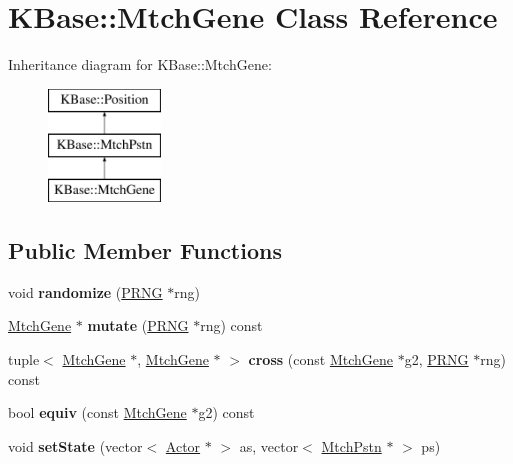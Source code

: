 \hypertarget{class_k_base_1_1_mtch_gene}{\section{K\-Base\-:\-:Mtch\-Gene Class Reference}
\label{class_k_base_1_1_mtch_gene}
}
Inheritance diagram for K\-Base\-:\-:Mtch\-Gene\-:\begin{figure}[H]
\begin{center}
\leavevmode
\includegraphics[height=3.000000cm]{class_k_base_1_1_mtch_gene}
\end{center}
\end{figure}
\subsection*{Public Member Functions}
\begin{DoxyCompactItemize}
\item 
\hypertarget{class_k_base_1_1_mtch_gene_a8386c386632b4e6dd8a99f3f126f0899}{void {\bfseries randomize} (\hyperlink{class_k_base_1_1_p_r_n_g}{P\-R\-N\-G} $\ast$rng)}\label{class_k_base_1_1_mtch_gene_a8386c386632b4e6dd8a99f3f126f0899}

\item 
\hypertarget{class_k_base_1_1_mtch_gene_a489185a8e050f4d697fda5bcbb14d304}{\hyperlink{class_k_base_1_1_mtch_gene}{Mtch\-Gene} $\ast$ {\bfseries mutate} (\hyperlink{class_k_base_1_1_p_r_n_g}{P\-R\-N\-G} $\ast$rng) const }\label{class_k_base_1_1_mtch_gene_a489185a8e050f4d697fda5bcbb14d304}

\item 
\hypertarget{class_k_base_1_1_mtch_gene_a7d33dcc982a4a74a760cb086309fa141}{tuple$<$ \hyperlink{class_k_base_1_1_mtch_gene}{Mtch\-Gene} $\ast$, \hyperlink{class_k_base_1_1_mtch_gene}{Mtch\-Gene} $\ast$ $>$ {\bfseries cross} (const \hyperlink{class_k_base_1_1_mtch_gene}{Mtch\-Gene} $\ast$g2, \hyperlink{class_k_base_1_1_p_r_n_g}{P\-R\-N\-G} $\ast$rng) const }\label{class_k_base_1_1_mtch_gene_a7d33dcc982a4a74a760cb086309fa141}

\item 
\hypertarget{class_k_base_1_1_mtch_gene_a686f60ab70b9bb2cc523a3fd191ee611}{bool {\bfseries equiv} (const \hyperlink{class_k_base_1_1_mtch_gene}{Mtch\-Gene} $\ast$g2) const }\label{class_k_base_1_1_mtch_gene_a686f60ab70b9bb2cc523a3fd191ee611}

\item 
\hypertarget{class_k_base_1_1_mtch_gene_a62261a1e6a71765badd513976c8679e7}{void {\bfseries set\-State} (vector$<$ \hyperlink{class_k_base_1_1_actor}{Actor} $\ast$ $>$ as, vector$<$ \hyperlink{class_k_base_1_1_mtch_pstn}{Mtch\-Pstn} $\ast$ $>$ ps)}\label{class_k_base_1_1_mtch_gene_a62261a1e6a71765badd513976c8679e7}

\end{DoxyCompactItemize}
